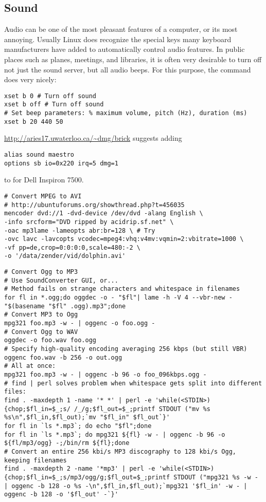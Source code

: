 \documentclass[12pt,twoside]{article}
\begin{document}
\subsection{Sound}\label{sxn:snd}
Audio can be one of the most pleasant features of a computer,
or its most annoying.
Usually Linux does recognize the special keys many keyboard
manufacturers have added to automatically control audio features.
In public places such as planes, meetings, and libraries, it is often
very desirable to turn off not just the sound server, but all audio
beeps. 
For this purpose, the  command does very nicely:
\begin{verbatim}
xset b 0 # Turn off sound
xset b off # Turn off sound
# Set beep parameters: % maximum volume, pitch (Hz), duration (ms)
xset b 20 440 50
\end{verbatim}

\url{http://aries17.uwaterloo.ca/~dmg/brick} suggests adding
\begin{verbatim}
alias sound maestro
options sb io=0x220 irq=5 dmg=1
\end{verbatim}
to  for Dell Inspiron 7500.

\begin{verbatim}
# Convert MPEG to AVI
# http://ubuntuforums.org/showthread.php?t=456035
mencoder dvd://1 -dvd-device /dev/dvd -alang English \
-info srcform="DVD ripped by acidrip.sf.net" \
-oac mp3lame -lameopts abr:br=128 \ # Try 
-ovc lavc -lavcopts vcodec=mpeg4:vhq:v4mv:vqmin=2:vbitrate=1000 \
-vf pp=de,crop=0:0:0:0,scale=480:-2 \
-o '/data/zender/vid/dolphin.avi'
\end{verbatim}

\begin{verbatim}
# Convert Ogg to MP3
# Use SoundConverter GUI, or...
# Method fails on strange characters and whitespace in filenames
for fl in *.ogg;do oggdec -o - "$fl"| lame -h -V 4 --vbr-new - "$(basename "$fl" .ogg).mp3";done
# Convert MP3 to Ogg
mpg321 foo.mp3 -w - | oggenc -o foo.ogg -
# Convert Ogg to WAV
oggdec -o foo.wav foo.ogg
# Specify high-quality encoding averaging 256 kbps (but still VBR)
oggenc foo.wav -b 256 -o out.ogg
# All at once:
mpg321 foo.mp3 -w - | oggenc -b 96 -o foo_096kbps.ogg -
# find | perl solves problem when whitespace gets split into different files:
find . -maxdepth 1 -name '* *' | perl -e 'while(<STDIN>){chop;$fl_in=$_;s/ /_/g;$fl_out=$_;printf STDOUT ("mv %s %s\n",$fl_in,$fl_out);`mv "$fl_in" $fl_out`}'
for fl in `ls *.mp3`; do echo "$fl";done
for fl in `ls *.mp3`; do mpg321 ${fl} -w - | oggenc -b 96 -o ${fl/mp3/ogg} -;/bin/rm ${fl};done
# Convert an entire 256 kbi/s MP3 discography to 128 kbi/s Ogg, keeping filenames
find . -maxdepth 2 -name '*mp3' | perl -e 'while(<STDIN>){chop;$fl_in=$_;s/mp3/ogg/g;$fl_out=$_;printf STDOUT ("mpg321 %s -w - | oggenc -b 128 -o %s -\n",$fl_in,$fl_out);`mpg321 '$fl_in' -w - | oggenc -b 128 -o '$fl_out' -`}'
\end{verbatim}
\end{document}
